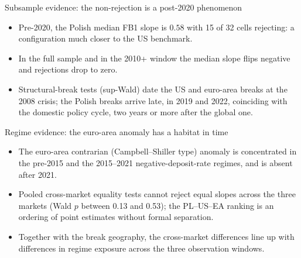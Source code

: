 \documentclass[aspectratio=169,11pt]{beamer}
\begin{document}
\begin{frame}{Subsample evidence: the non-rejection is a post-2020 phenomenon}
  \begin{itemize}
    \item Pre-2020, the Polish median FB1 slope is $0.58$ with 15 of 32 cells
          rejecting: a configuration much closer to the US benchmark.
    \item In the full sample and in the 2010+ window the median slope flips
          negative and rejections drop to zero.
    \item Structural-break tests (sup-Wald) date the US and euro-area breaks
          at the 2008 crisis; the Polish breaks arrive late, in 2019 and 2022,
          coinciding with the domestic policy cycle, two years or more after
          the global one.
  \end{itemize}
\end{frame}

\begin{frame}{Regime evidence: the euro-area anomaly has a habitat in time}
  \begin{itemize}
    \item The euro-area contrarian (Campbell--Shiller type) anomaly is
          concentrated in the pre-2015 and the 2015--2021 negative-deposit-rate
          regimes, and is absent after 2021.
    \item Pooled cross-market equality tests cannot reject equal slopes across
          the three markets (Wald $p$ between 0.13 and 0.53); the PL--US--EA
          ranking is an ordering of point estimates without formal
          separation.
    \item Together with the break geography, the cross-market differences line
          up with differences in regime exposure across the three observation
          windows.
  \end{itemize}
\end{frame}
\end{document}
